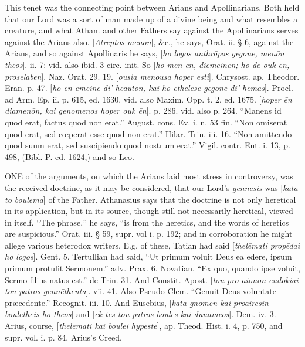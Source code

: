 This tenet was the connecting point between
Arians and Apollinarians. Both held that our Lord was a sort of man
made up of a divine being and what resembles a creature, and what
Athan. and other Fathers say against the Apollinarians serves against
the Arians also. [\emph{Atreptos men\={o}n}], \&c., he says,
Orat. ii. § 6, against the Arians, and so against Apollinaris he
says, [\emph{ho logos anthr\={o}pos gegone, men\={o}n theos}].
ii. 7: vid. also ibid. 3 circ. init. So [\emph{ho men \={e}n,
diemeinen; ho de ouk \={e}n, proselaben}]. Naz. Orat. 29. 19. [\emph{ousia
menousa hoper esti}]. Chrysost. ap. Theodor. Eran. p. 47. [\emph{ho \={e}n
emeine di' heauton, kai
ho \={e}thel\={e}se gegone di' h\={e}mas}]. Procl.
ad Arm. Ep. ii. p. 615, ed. 1630. vid. also Maxim. Opp. t. 2, ed.
1675. [\emph{hoper \={e}n diamen\={o}n, kai genomenos hoper ouk \={e}n}].
p. 286. vid. also p. 264. “Manens id quod erat, factus quod non erat.”
August. cons. Ev. i. n. 53 fin. “Non omiserat quod erat, sed cœperat
esse quod non erat.” Hilar. Trin. iii. 16. “Non amittendo quod
suum erat, sed suscipiendo quod nostrum erat.” Vigil. contr. Eut. i.
13, p. 498, (Bibl. P. ed. 1624,) and so Leo.


ONE
of the arguments, on which the Arians laid most stress in controversy,
was the received doctrine, as it may be considered, that our Lord’s \emph{gennesis}
was [\emph{kata to boul\={e}ma}] of the Father. Athanasius says
that the doctrine is not only heretical in its application, but in its
source, though still not necessarily heretical, viewed in itself.
“The phrase,” he says, “is from the heretics, and the words of
heretics are suspicious.” Orat. iii. § 59, supr. vol i. p. 192; and
in corroboration he might allege various heterodox writers. E.g. of
these, Tatian had said [\emph{thel\={e}mati prop\={e}dai ho logos}].
Gent. 5. Tertullian had said, “Ut primum voluit Deus ea edere, ipsum
primum protulit Sermonem.” adv. Prax. 6. Novatian, “Ex quo, quando
ipse voluit, Sermo filius natus est.” de Trin. 31. And Constit.
Apost. [\emph{ton pro ai\={o}n\={o}n eudokiai tou patros genn\={e}thenta}].
vii. 41. Also Pseudo-Clem. “Genuit Deus voluntate præcedente.”
Recognit. iii. 10. And Eusebius, [\emph{kata gn\={o}m\={e}n kai
proairesin boul\={e}theis ho theos}] and [\emph{ek t\={e}s tou
patros boul\={e}s kai duname\={o}s}]. Dem. iv. 3. Arius,
course, [\emph{thel\={e}mati kai boul\={e}i hypest\={e}}], ap.
Theod. Hist. i. 4, p. 750, and supr. vol. i. p. 84, Arius’s Creed.

